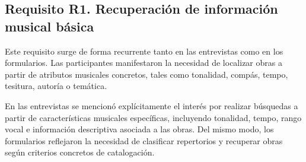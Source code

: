 
\subsection{Requisito R1. Recuperación de información musical básica}
Este requisito surge de forma recurrente tanto en las entrevistas como en los formularios. Las participantes manifestaron la necesidad de localizar obras a partir de atributos musicales concretos, tales como tonalidad, compás, tempo, tesitura, autoría o temática.

En las entrevistas se mencionó explícitamente el interés por realizar búsquedas a partir de características musicales específicas, incluyendo tonalidad, tempo, rango vocal e información descriptiva asociada a las obras. Del mismo modo, los formularios reflejaron la necesidad de clasificar repertorios y recuperar obras según criterios concretos de catalogación.

